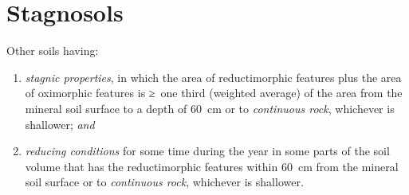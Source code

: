 \documentclass[
  letterpaper,
  DIV=11,
  numbers=noendperiod]{scrreprt}
\providecommand{\tightlist}{%
  \setlength{\itemsep}{0pt}\setlength{\parskip}{0pt}}\usepackage{longtable,booktabs,array}
\begin{document}

\hypertarget{key-stagnosols}{%
\chapter{Stagnosols}\label{key-stagnosols}}

Other soils having:

\begin{enumerate}
\def\labelenumi{\arabic{enumi}.}
\tightlist
\item
  \emph{stagnic properties}, in which the area of reductimorphic
  features plus the area of oximorphic features is ≥~one third (weighted
  average) of the area from the mineral soil surface to a depth of 60~cm
  or to \emph{continuous rock}, whichever is shallower; \emph{and}
\item
  \emph{reducing conditions} for some time during the year in some parts
  of the soil volume that has the reductimorphic features within 60~cm
  from the mineral soil surface or to \emph{continuous rock}, whichever
  is shallower.
\end{enumerate}
\end{document}
